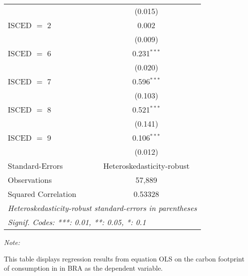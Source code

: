 \begin{table}[htbp!]
\begin{adjustbox}{width = 1\textwidth, max height = 0.95\textheight, center}
\begin{threeparttable}[b]
\begin{tabular}{lc}
                                & (0.015)\\   
            ISCED $=$ 2         & 0.002\\   
                                & (0.009)\\   
            ISCED $=$ 6         & 0.231$^{***}$\\   
                                & (0.020)\\   
            ISCED $=$ 7         & 0.596$^{***}$\\   
                                & (0.103)\\   
            ISCED $=$ 8         & 0.521$^{***}$\\   
                                & (0.141)\\   
            ISCED $=$ 9         & 0.106$^{***}$\\   
                                & (0.012)\\   
            \midrule 
            Standard-Errors     & Heteroskedasticity-robust \\   
            Observations        & 57,889\\  
            Squared Correlation & 0.53328\\  
            \midrule \midrule
            \multicolumn{2}{l}{\emph{Heteroskedasticity-robust standard-errors in parentheses}}\\
            \multicolumn{2}{l}{\emph{Signif. Codes: ***: 0.01, **: 0.05, *: 0.1}}\\
         \end{tabular}
         
         \begin{tablenotes}\item \medskip \textit{Note:}
            \item This table displays regression results from equation OLS on the carbon footprint of consumption in  in BRA as the dependent variable.  
         \end{tablenotes}
      \end{threeparttable}
   \end{adjustbox}
\end{table}


